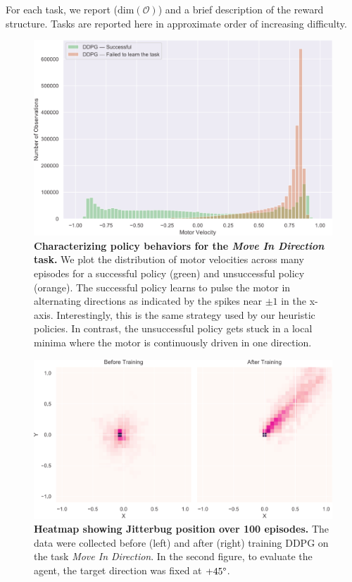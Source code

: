 \documentclass[letterpaper, 10 pt, conference]{ieeeconf}
\begin{document}
For each task, we report ($\text{dim}(\mathcal{O})$) and a brief description of the reward structure.
Tasks are reported here in approximate order of increasing difficulty.

\begin{figure}[t]
    \centering
    \includegraphics[width=\linewidth]{fig-motor-hist}
    \caption{
        \textbf{Characterizing policy behaviors for the \emph{Move In Direction} task.}
        We plot the distribution of motor velocities across many episodes for a successful policy (green) and unsuccessful policy (orange).
        The successful policy learns to pulse the motor in alternating directions as indicated by the spikes near $\pm 1$ in the x-axis.
        Interestingly, this is the same strategy used by our heuristic policies.
        In contrast, the unsuccessful policy gets stuck in a local minima where the motor is continuously driven in one direction.
    }
    \label{fig:motor-hist}
\end{figure}

\begin{figure}[t]
    \centering
    \includegraphics[width=\linewidth]{fig-heatmap}
    \caption{
        \textbf{Heatmap showing Jitterbug position over 100 episodes.}
        The data were collected before (left) and after (right) training DDPG on the task \emph{Move In Direction}.
        In the second figure, to evaluate the agent, the target direction was fixed at $+45\degree$.
    }
    \label{fig:heatmap}
\end{figure}
\end{document}

